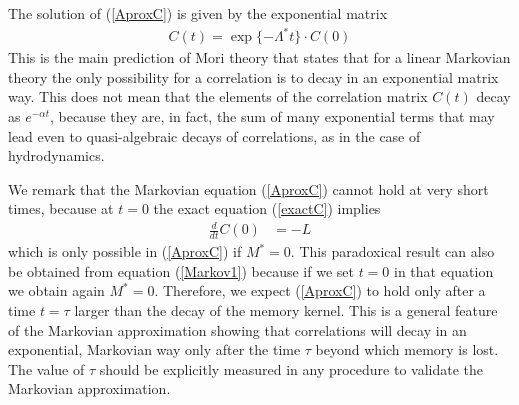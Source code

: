 \documentclass[b5paper,openright,10pt]{book}
\newcommand{\esc}{\!\cdot\!}
\begin{document}
 The solution of (\ref{AproxC})  is given by
the exponential matrix 
\begin{align}
  C(t)=\exp\{-\Lambda^* t\}\esc C(0)
\label{Csol}
\end{align}
This is  the main  prediction of  Mori theory that  states that  for a
linear Markovian theory  the only possibility for a  correlation is to
decay  in an  exponential  matrix way.  This does  not  mean that  the
elements of  the correlation matrix  $C(t)$ decay as  $e^{-\alpha t}$,
because they are, in fact, the  sum of many exponential terms that may
lead even to quasi-algebraic decays of correlations, as in the case of
hydrodynamics.

We remark that  the Markovian equation  (\ref{AproxC}) cannot  hold at very
short  times,  because  at  $t=0$ the  exact  equation  (\ref{exactC})
implies
\begin{align}
    \frac{d}{dt}C(0)&=-L
\end{align}
which is only possible in  (\ref{AproxC}) if $M^*=0$. This paradoxical
result can  also be obtained  from equation  (\ref{Markov1}) because  if we
set $t=0$  in that  equation we obtain  again $M^*=0$.   Therefore, we
expect (\ref{AproxC}) to  hold only after a time  $t=\tau$ larger than
the decay  of the  memory kernel.   This is a  general feature  of the
Markovian  approximation showing  that correlations  will decay  in an
exponential, Markovian  way only  after the  time $\tau$  beyond which
memory is lost.  The value of  $\tau$ should be explicitly measured in
any procedure to validate the Markovian approximation.
\end{document}
